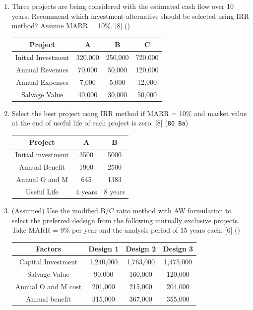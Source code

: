 \documentclass[12pt]{article}
\begin{document}
\begin{enumerate}
		\item Three projects are being considered with the estimated cash flow over 10 years. Recommend which investment alternative should be selected using IRR method? Assume MARR = 10\%. \hfill [8] ()\\
		\begin{tabular}{|c|c|c|c|}
			\hline
			Project & A & B & C \\ \hline
			Initial Investment & 320,000 & 250,000 & 720,000 \\ \hline
			Annual Revenues & 70,000 & 50,000 & 120,000 \\ \hline
			Annual Expenses & 7,000 & 5,000 & 12,000 \\ \hline
			Salvage Value & 40,000 & 30,000 & 50,000 \\ \hline
		\end{tabular}
		
		\item Select the best project using IRR method if MARR = 10\% and market value at the end of useful life of each project is zero. \hfill [8] (\texttt{80 Ba})\\
		\begin{tabular}{|c|c|c|}
			\hline
			Project & A & B \\ \hline
			Initial investment & 3500 & 5000 \\ \hline
			Annual Benefit & 1900 & 2500 \\ \hline
			Annual O and M & 645 & 1383 \\ \hline
			Useful Life & 4 years & 8 years \\ \hline
		\end{tabular}
		
		\item (Assumed) Use the modified B/C ratio method with AW formulation to select the preferred dedsign from the following mutually exclusive projects. Take MARR = 9\% per year and the analysis period of 15 years each. \hfill [6] ()\\
		\begin{tabular}{|c|c|c|c|}
			\hline
			Factors & Design 1 & Design 2 & Design 3 \\ \hline
			Capital Investment & 1,240,000 & 1,763,000 & 1,475,000 \\ \hline
			Salvage Value & 90,000 & 160,000 & 120,000 \\ \hline
			Annual O and M cost & 201,000 & 215,000 & 204,000 \\ \hline
			Annual benefit & 315,000 & 367,000 & 355,000 \\ \hline
		\end{tabular}
		

\end{enumerate}
\end{document}
